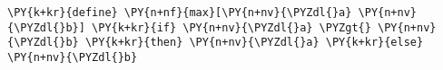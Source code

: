 \begin{Verbatim}[commandchars=\\\{\}]
\PY{k+kr}{define} \PY{n+nf}{max}[\PY{n+nv}{\PYZdl{}a} \PY{n+nv}{\PYZdl{}b}] \PY{k+kr}{if} \PY{n+nv}{\PYZdl{}a} \PYZgt{} \PY{n+nv}{\PYZdl{}b} \PY{k+kr}{then} \PY{n+nv}{\PYZdl{}a} \PY{k+kr}{else} \PY{n+nv}{\PYZdl{}b}
\end{Verbatim}
